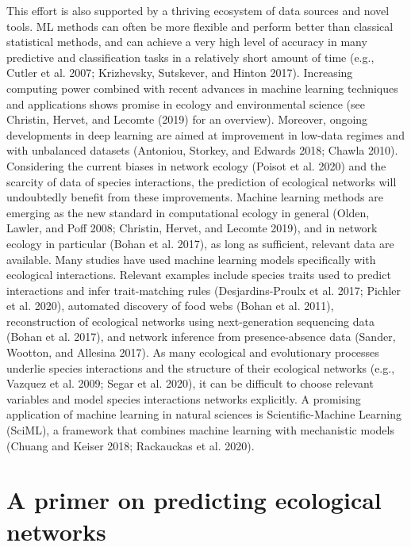 \documentclass[10pt,oneside]{article}
\begin{document}
This effort is also supported by a thriving ecosystem of data sources
and novel tools. ML methods can often be more flexible and perform
better than classical statistical methods, and can achieve a very high
level of accuracy in many predictive and classification tasks in a
relatively short amount of time (e.g., Cutler et al. 2007; Krizhevsky,
Sutskever, and Hinton 2017). Increasing computing power combined with
recent advances in machine learning techniques and applications shows
promise in ecology and environmental science (see Christin, Hervet, and
Lecomte (2019) for an overview). Moreover, ongoing developments in deep
learning are aimed at improvement in low-data regimes and with
unbalanced datasets (Antoniou, Storkey, and Edwards 2018; Chawla 2010).
Considering the current biases in network ecology (Poisot et al. 2020)
and the scarcity of data of species interactions, the prediction of
ecological networks will undoubtedly benefit from these improvements.
Machine learning methods are emerging as the new standard in
computational ecology in general (Olden, Lawler, and Poff 2008;
Christin, Hervet, and Lecomte 2019), and in network ecology in
particular (Bohan et al. 2017), as long as sufficient, relevant data are
available. Many studies have used machine learning models specifically
with ecological interactions. Relevant examples include species traits
used to predict interactions and infer trait-matching rules
(Desjardins-Proulx et al. 2017; Pichler et al. 2020), automated
discovery of food webs (Bohan et al. 2011), reconstruction of ecological
networks using next-generation sequencing data (Bohan et al. 2017), and
network inference from presence-absence data (Sander, Wootton, and
Allesina 2017). As many ecological and evolutionary processes underlie
species interactions and the structure of their ecological networks
(e.g., Vazquez et al. 2009; Segar et al. 2020), it can be difficult to
choose relevant variables and model species interactions networks
explicitly. A promising application of machine learning in natural
sciences is Scientific-Machine Learning (SciML), a framework that
combines machine learning with mechanistic models (Chuang and Keiser
2018; Rackauckas et al. 2020).

\hypertarget{a-primer-on-predicting-ecological-networks}{%
\section{A primer on predicting ecological
networks}\label{a-primer-on-predicting-ecological-networks}}
\end{document}
